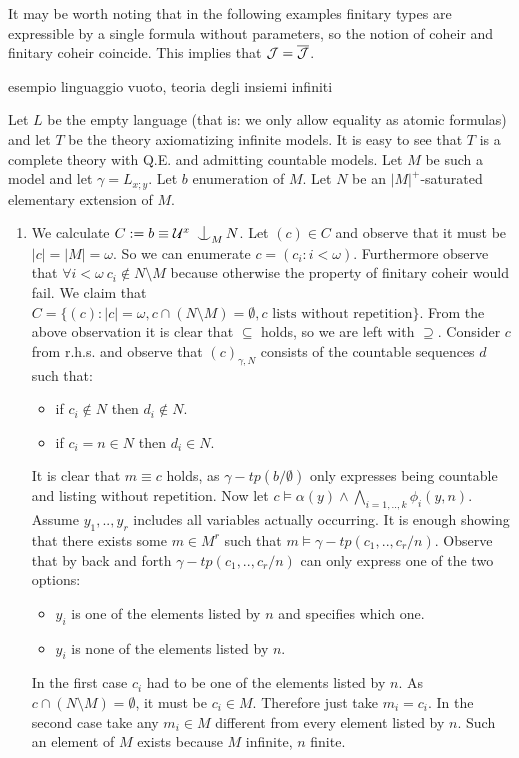 \documentclass[../main.tex]{subfiles}
\begin{document}
It may be worth noting that in the following examples finitary types are expressible by a single formula without parameters, so the notion of coheir and finitary coheir coincide.
This implies that $\mathcal{J} = \mathcal{\overline{J}}$.

\begin{example}
	esempio linguaggio vuoto, teoria degli insiemi infiniti

	Let $L$ be the empty language (that is: we only allow equality as atomic formulas) and let $T$ be the theory axiomatizing infinite models.
	It is easy to see that $T$ is a complete theory with Q.E. and admitting countable models.
	Let $M$ be such a model and let $\gamma = L_{x;y}$. Let $b$ enumeration of $M$. Let $N$ be an $|M|^+$-saturated elementary extension of $M$.
	\begin{enumerate}
		\item	We calculate $C := b \equiv \U^x \nonfork_M N$. Let $(c) \in C$ and observe that it must be $|c| = |M| = \omega$.
			So we can enumerate $c = (c_i : i < \omega)$. Furthermore observe that $\forall i < \omega \ c_i \not \in N \setminus M$ 
			because otherwise the property of finitary coheir would fail.
			We claim that $C = \{(c): |c| = \omega, c \cap (N \setminus M) = \emptyset, c \text{ lists without repetition}\}$.
			From the above observation it is clear that $\subseteq$ holds, so we are left with $\supseteq$.
			Consider $c$ from r.h.s. and observe that $(c)_{\gamma,N}$ consists of the countable sequences $d$ such that:
			\begin{itemize}
				\item	if $c_i \not \in N$ then $d_i \not \in N$.
				\item	if $c_i = n \in N$ then $d_i \in N$.
			\end{itemize}
			It is clear that $m \equiv c$ holds, as $\gamma-tp(b/\emptyset)$ only expresses being countable and listing without repetition.
			Now let $c \models \alpha(y) \land \bigwedge_{i=1,..,k} \phi_i(y,n)$. Assume $y_1,..,y_r$ includes all variables actually occurring.
			It is enough showing that there exists some $m \in M^r$ such that $m \models \gamma-tp(c_1,..,c_r/n)$.
			Observe that by back and forth $\gamma-tp(c_1,..,c_r/n)$ can only express one of the two options:
			\begin{itemize}
				\item	$y_i$ is one of the elements listed by $n$ and specifies which one.
				\item	$y_i$ is none of the elements listed by $n$.
			\end{itemize}
			In the first case $c_i$ had to be one of the elements listed by $n$. As $c \cap (N \setminus M) = \emptyset$, it must be $c_i \in M$.
			Therefore just take $m_i = c_i$.
			In the second case take any $m_i \in M$ different from every element listed by $n$. Such an element of $M$ exists because $M$ infinite, $n$ finite.
		

\end{enumerate}
\end{example}
\end{document}
